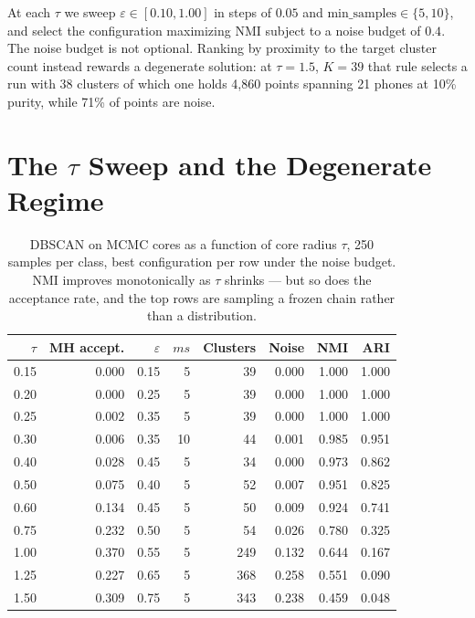 \documentclass[11pt]{article}
\begin{document}
At each $\tau$ we sweep $\varepsilon \in [0.10,1.00]$ in steps of $0.05$ and
$\mathrm{min\_samples} \in \{5,10\}$, and select the configuration maximizing NMI
subject to a noise budget of $0.4$. The noise budget is not optional. Ranking by
proximity to the target cluster count instead rewards a degenerate solution: at
$\tau=1.5$, $K=39$ that rule selects a run with 38 clusters of which one holds
4{,}860 points spanning 21 phones at 10\% purity, while 71\% of points are noise.

\section{The $\tau$ Sweep and the Degenerate Regime}
\label{sec:sweep}

\begin{table}[H]
\centering
\caption{DBSCAN on MCMC cores as a function of core radius $\tau$, 250 samples
per class, best configuration per row under the noise budget. NMI improves
monotonically as $\tau$ shrinks --- but so does the acceptance rate, and the top
rows are sampling a frozen chain rather than a distribution.}
\label{tab:sweep}
\begin{tabular}{rrrrrrrr}
\toprule
$\tau$ & MH accept. & $\varepsilon$ & $ms$ & Clusters & Noise & NMI & ARI \\
\midrule
0.15 & 0.000 & 0.15 & 5 &  39 & 0.000 & 1.000 & 1.000 \\
0.20 & 0.000 & 0.25 & 5 &  39 & 0.000 & 1.000 & 1.000 \\
0.25 & 0.002 & 0.35 & 5 &  39 & 0.000 & 1.000 & 1.000 \\
\midrule
0.30 & 0.006 & 0.35 & 10 &  44 & 0.001 & 0.985 & 0.951 \\
0.40 & 0.028 & 0.45 & 5 &  34 & 0.000 & 0.973 & 0.862 \\
0.50 & 0.075 & 0.40 & 5 &  52 & 0.007 & 0.951 & 0.825 \\
0.60 & 0.134 & 0.45 & 5 &  50 & 0.009 & 0.924 & 0.741 \\
0.75 & 0.232 & 0.50 & 5 &  54 & 0.026 & 0.780 & 0.325 \\
1.00 & 0.370 & 0.55 & 5 & 249 & 0.132 & 0.644 & 0.167 \\
1.25 & 0.227 & 0.65 & 5 & 368 & 0.258 & 0.551 & 0.090 \\
1.50 & 0.309 & 0.75 & 5 & 343 & 0.238 & 0.459 & 0.048 \\
\bottomrule
\end{tabular}
\end{table}
\end{document}
